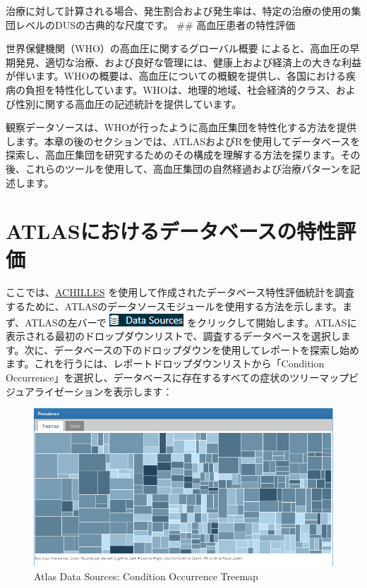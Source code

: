 \documentclass[
  11pt]{book}
\theoremstyle{definition}
\theoremstyle{definition}
\theoremstyle{definition}
\theoremstyle{definition}
\theoremstyle{remark}
\begin{document}
治療に対して計算される場合、発生割合および発生率は、特定の治療の使用の集団レベルのDUSの古典的な尺度です。
\#\# 高血圧患者の特性評価

世界保健機関（WHO）の高血圧に関するグローバル概要 \citep{WHOHypertension} によると、高血圧の早期発見、適切な治療、および良好な管理には、健康上および経済上の大きな利益が伴います。WHOの概要は、高血圧についての概観を提供し、各国における疾病の負担を特性化しています。WHOは、地理的地域、社会経済的クラス、および性別に関する高血圧の記述統計を提供しています。

観察データソースは、WHOが行ったように高血圧集団を特性化する方法を提供します。本章の後のセクションでは、ATLASおよびRを使用してデータベースを探索し、高血圧集団を研究するためのその構成を理解する方法を探ります。その後、これらのツールを使用して、高血圧集団の自然経過および治療パターンを記述します。

\section{ATLASにおけるデータベースの特性評価}\label{atlasux306bux304aux3051ux308bux30c7ux30fcux30bfux30d9ux30fcux30b9ux306eux7279ux6027ux8a55ux4fa1}

ここでは、\href{https://github.com/OHDSI/Achilles}{ACHILLES} を使用して作成されたデータベース特性評価統計を調査するために、ATLASのデータソースモジュールを使用する方法を示します。まず、ATLASの左バーで \includegraphics{images/Characterization/atlasDataSourcesMenuItem.png} をクリックして開始します。ATLASに表示される最初のドロップダウンリストで、調査するデータベースを選択します。次に、データベースの下のドロップダウンを使用してレポートを探索し始めます。これを行うには、レポートドロップダウンリストから「Condition Occurrence」を選択し、データベースに存在するすべての症状のツリーマップビジュアライゼーションを表示します：

\begin{figure}

{\centering \includegraphics[width=1\linewidth]{images/Characterization/atlasDataSourcesConditionTreemap} 

}

\caption{Atlas Data Sources: Condition Occurrence Treemap}\label{fig:atlasDataSourcesConditionTreemap}
\end{figure}
\end{document}

